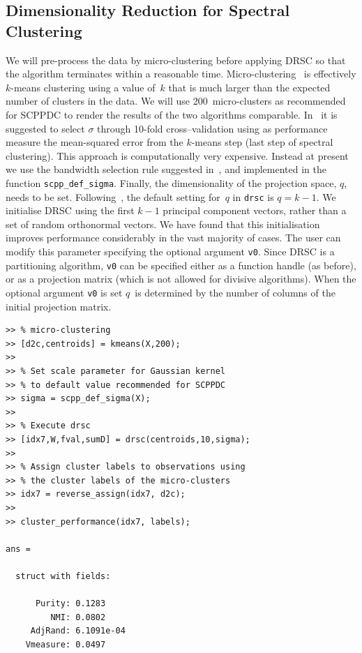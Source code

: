 \documentclass{book}
\begin{document}
\subsection{Dimensionality Reduction for Spectral Clustering}

We will pre-process the data by micro-clustering before applying DRSC so that
the algorithm terminates within a reasonable time.
%
Micro-clustering~\cite{Zhang1996} is effectively $k$-means clustering using
a value of~$k$ that is much larger than the expected number of clusters in
the data.
%
%
We will use 200~micro-clusters as recommended for SCPPDC to render the results
of the two algorithms comparable.
%
In~\cite{NiuDJ2011} it
is suggested to select $\sigma$ through 10-fold cross--validation using as
performance measure the mean-squared error from the $k$-means step (last step of
spectral clustering).
%
This approach is computationally very expensive. Instead at present we use
the bandwidth selection rule suggested in~\cite{HofmeyrPE2018}, and implemented
in the function {\tt scpp\_def\_sigma}.
%
Finally, the dimensionality of the projection space, $q$, needs to be set.
Following~\cite{NiuDJ2011}, the default setting for~$q$ in {\tt drsc} is
$q=k-1$. We initialise DRSC using the first $k-1$ principal component vectors,
rather than a set of random orthonormal vectors.
We have found that this initialisation improves performance considerably
in the vast majority of cases.
%
The user can modify this parameter specifying the optional argument {\tt v0}. Since
DRSC is a partitioning algorithm, {\tt v0} can be specified either as a function
handle (as before), or as a projection matrix (which is not allowed for
divisive algorithms).
%
When the optional argument {\tt v0} is set $q$~is determined by the
number of columns of the initial projection matrix.

\begin{verbatim}
>> % micro-clustering
>> [d2c,centroids] = kmeans(X,200); 
>>
>> % Set scale parameter for Gaussian kernel
>> % to default value recommended for SCPPDC
>> sigma = scpp_def_sigma(X);
>> 
>> % Execute drsc
>> [idx7,W,fval,sumD] = drsc(centroids,10,sigma);
>>
>> % Assign cluster labels to observations using
>> % the cluster labels of the micro-clusters
>> idx7 = reverse_assign(idx7, d2c);
>>
>> cluster_performance(idx7, labels);

ans = 

  struct with fields:

      Purity: 0.1283
         NMI: 0.0802
     AdjRand: 6.1091e-04
    Vmeasure: 0.0497

\end{verbatim}
\end{document}
